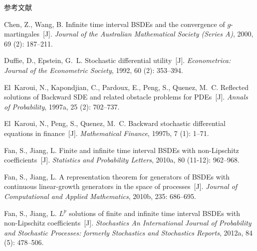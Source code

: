 \documentclass[xcolor=svgnames,serif,table,10pt]{beamer}
\begin{document}
\begin{frame}[allowframebreaks]{参考文献}
\begin{thebibliography}{57}
Chen, Z., Wang, B.
\newblock Infinite time interval {BSDE}s and the convergence of
  $g$-martingales~[J].
\newblock \emph{Journal of the Australian Mathematical Society (Series A)},
  2000, 69 (2): 187--211.

Duffie, D., Epstein, G.~L.
\newblock Stochastic differential utility~[J].
\newblock \emph{Econometrica: Journal of the Econometric Society}, 1992,
  60 (2): 353--394.

El~Karoui, N., Kapondjian, C., Pardoux, E., Peng, S., Quenez, M.~C.
\newblock Reflected solutions of {B}ackward {SDE} and related obstacle problems
  for {PDE}s~[J].
\newblock \emph{Annals of Probability}, 1997a, 25
  (2): 702--737.

El~Karoui, N., Peng, S., Quenez, M.~C.
\newblock Backward stochastic differential equations in finance~[J].
\newblock \emph{Mathematical Finance}, 1997b, 7
  (1): 1--71.


Fan, S., Jiang, L.
\newblock Finite and infinite time interval {BSDE}s with non-{L}ipschitz
  coefficients~[J].
\newblock \emph{Statistics and Probability Letters}, 2010a, 80
  (11-12): 962--968.

Fan, S., Jiang, L.
\newblock A representation theorem for generators of {BSDE}s with continuous
  linear-growth generators in the space of processes~[J].
\newblock \emph{Journal of Computational and Applied Mathematics}, 2010b,
  235: 686--695.

Fan, S., Jiang, L.
\newblock ${L}^p$ solutions of finite and infinite time interval {BSDE}s with
  non-{L}ipschitz coefficients~[J].
\newblock \emph{Stochastics An International Journal of Probability and
  Stochastic Processes: formerly Stochastics and Stochastics Reports},
  2012a, 84 (5): 478--506.


\end{thebibliography}
\end{frame}
\end{document}
